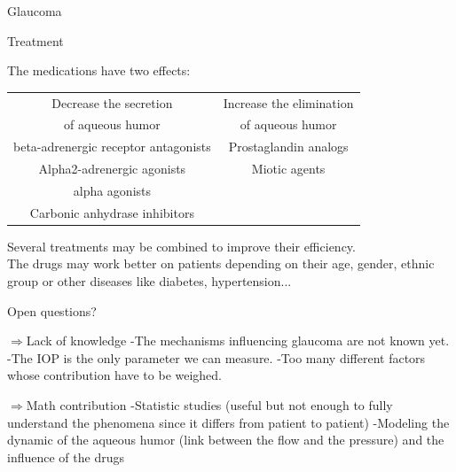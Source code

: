 \begin{frame}{Glaucoma}
{\begin{center}
\end{center}}
\end{frame}

\begin{frame}[shrink=5]{Treatment}

The medications have two effects:
\newline
\\
\begin{tabular}{|c|c|}
\hline
Decrease the secretion & Increase the elimination \\
of aqueous humor &  of aqueous humor\\
\hline
beta-adrenergic receptor antagonists & Prostaglandin analogs \\
Alpha2-adrenergic agonists & Miotic agents \\
alpha agonists &  \\
Carbonic anhydrase inhibitors &  \\
\hline
\end{tabular}
\newline
\newline

Several treatments may be combined to improve their efficiency.\\
The drugs may work better on patients depending on their age, gender, ethnic group or other diseases like diabetes, hypertension...

\end{frame}

\begin{frame}{Open questions?}

$\Rightarrow$Lack of knowledge\newline
-The mechanisms influencing glaucoma are not known yet.\newline
-The IOP is the only parameter we can measure.\newline
-Too many different factors whose contribution have to be weighed.\newline

$\Rightarrow$Math contribution\newline
-Statistic studies (useful but not enough to fully understand the phenomena since it differs from patient to patient)\newline
-Modeling the dynamic of the aqueous humor (link between the flow and the pressure) and the influence of the drugs

\end{frame}